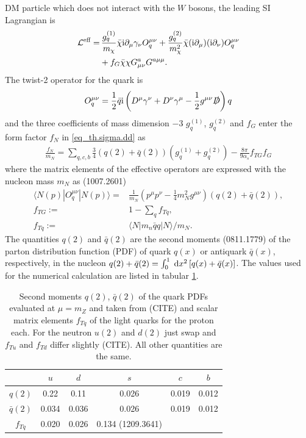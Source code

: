 DM particle which does not interact with the $W$ bosons, the leading SI Lagrangian is
\begin{align}
 \mathcal{L}^\text{eff} =&\, \frac{g_q^{(1)}}{m_\chi} \bar \chi\text{i} \partial_\mu \gamma_\nu O_q^{\mu\nu} + \frac{g_q^{(2)}}{m^2_\chi} \bar \chi(\text{i} \partial_\mu) (\text{i}\partial_\nu) O_q^{\mu\nu} \\
 \nonumber
 &+ f_G \bar \chi \chi G^a_{\mu\nu} G^{a\mu\mu}.
\end{align}
The twist-2 operator for the quark is
\begin{align}
 O_q^{\mu\nu} = \frac12 \bar q \text{i} \left(D^\mu \gamma^\nu + D^\nu \gamma^\mu - \frac12 g^{\mu\nu} \slashed{D}\right) q
\end{align}
and the three coefficients of mass dimension $-3$ $g_q^{(1)}$, $g_q^{(2)}$ and $f_G$ enter the form factor $f_N$ in \eqref{eq_th.sigma.dd} as
\begin{align}
 \frac{f_N}{m_N} = \sum\limits_{q,c,b} \frac34 \left(q(2)+\bar q(2)\right) \left(g_q^{(1)} + g_q^{(2)}\right) - \frac{8\pi}{9\alpha_s}f_{TG}f_G
 \label{eq_ddformfactorA}
\end{align}
where the matrix elements of the effective operators are expressed with the nucleon mass $m_N$ as (1007.2601)
\begin{subequations}
\begin{align}
 \langle N(p)| O_q^{\mu\nu} | N(p)\rangle =& \frac{1}{m_N}\left(p^\mu p^\nu - \frac14 m_N^2 g^{\mu\nu}\right) \left(q(2) + \bar q(2)\right),\\
 f_{TG} :=& 1- \sum\limits_q f_{Tq},\\
 f_{Tq} :=& \langle N|m_n \bar qq |N\rangle /m_N.
\end{align}
\end{subequations}
The quantities $q(2)$ and $\bar q(2)$ are the second moments (0811.1779) of the parton distribution function (PDF) of quark $q(x)$ or antiquark 
$\bar q(x)$, respectively, in the nucleon $q(2)+\bar q(2) = \int_0^1 \; \mathrm{d} x^2 \left[q(x) + \bar q(x)\right]$. The values used for the numerical
calculation are listed in tabular \ref{tab_parton}.
\begin{table}[b]
 \begin{tabular}{c|ccccc}
   & $u$ & $d$ & $s$ & $c$ &$b$ \\
   \hline
  $q(2)$ & 0.22 & 0.11 & 0.026 & 0.019 & 0.012\\
  $\bar q(2)$ & 0.034 & 0.036 & 0.026 & 0.019 & 0.012\\
  $f_{Tq}$ & 0.020& 0.026 & 0.134 (1209.3641)\\
 \end{tabular}
\caption{Second moments $q(2)$, $\bar q(2)$ of the quark PDFs evaluated at $\mu=m_Z$ and taken from (CITE) and scalar matrix elements $f_{Tq}$ of 
the light quarks for the 
proton each. For the neutron $u(2)$ and $d(2)$ just swap and $f_{Tu}$ and $f_{Td}$ differ slightly (CITE). All other quantities are the same. }
\label{tab_parton}
\end{table}
